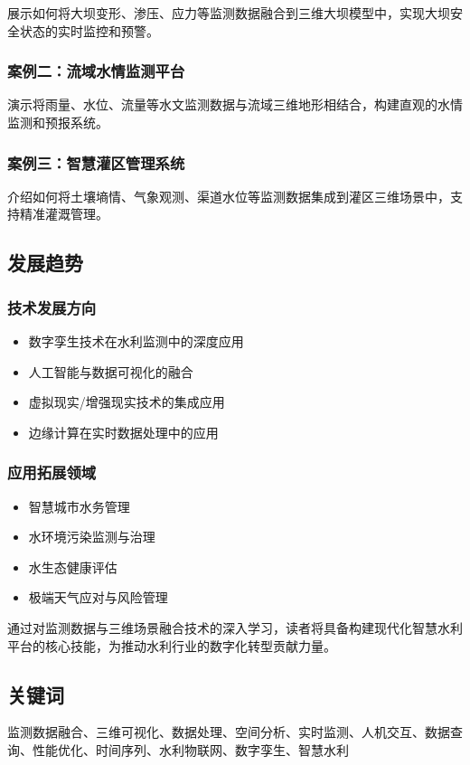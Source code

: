 展示如何将大坝变形、渗压、应力等监测数据融合到三维大坝模型中，实现大坝安全状态的实时监控和预警。

\subsubsection{案例二：流域水情监测平台}\label{ux6848ux4f8bux4e8cux6d41ux57dfux6c34ux60c5ux76d1ux6d4bux5e73ux53f0}

演示将雨量、水位、流量等水文监测数据与流域三维地形相结合，构建直观的水情监测和预报系统。

\subsubsection{案例三：智慧灌区管理系统}\label{ux6848ux4f8bux4e09ux667aux6167ux704cux533aux7ba1ux7406ux7cfbux7edf}

介绍如何将土壤墒情、气象观测、渠道水位等监测数据集成到灌区三维场景中，支持精准灌溉管理。

\subsection{发展趋势}\label{ux53d1ux5c55ux8d8bux52bf}

\subsubsection{技术发展方向}\label{ux6280ux672fux53d1ux5c55ux65b9ux5411}

\begin{itemize}
\tightlist
\item
  数字孪生技术在水利监测中的深度应用
\item
  人工智能与数据可视化的融合
\item
  虚拟现实/增强现实技术的集成应用
\item
  边缘计算在实时数据处理中的应用
\end{itemize}

\subsubsection{应用拓展领域}\label{ux5e94ux7528ux62d3ux5c55ux9886ux57df}

\begin{itemize}
\tightlist
\item
  智慧城市水务管理
\item
  水环境污染监测与治理
\item
  水生态健康评估
\item
  极端天气应对与风险管理
\end{itemize}

通过对监测数据与三维场景融合技术的深入学习，读者将具备构建现代化智慧水利平台的核心技能，为推动水利行业的数字化转型贡献力量。

\subsection{关键词}\label{ux5173ux952eux8bcd}

监测数据融合、三维可视化、数据处理、空间分析、实时监测、人机交互、数据查询、性能优化、时间序列、水利物联网、数字孪生、智慧水利
